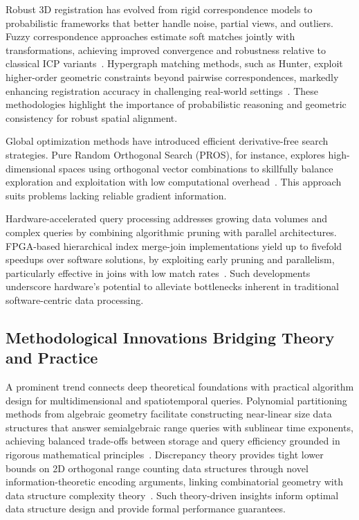 \documentclass[sigconf]{acmart}
\begin{document}
Robust 3D registration has evolved from rigid correspondence models to probabilistic frameworks that better handle noise, partial views, and outliers. Fuzzy correspondence approaches estimate soft matches jointly with transformations, achieving improved convergence and robustness relative to classical ICP variants~\cite{ref6}. Hypergraph matching methods, such as Hunter, exploit higher-order geometric constraints beyond pairwise correspondences, markedly enhancing registration accuracy in challenging real-world settings~\cite{ref7}. These methodologies highlight the importance of probabilistic reasoning and geometric consistency for robust spatial alignment.

Global optimization methods have introduced efficient derivative-free search strategies. Pure Random Orthogonal Search (PROS), for instance, explores high-dimensional spaces using orthogonal vector combinations to skillfully balance exploration and exploitation with low computational overhead~\cite{ref11}. This approach suits problems lacking reliable gradient information.

Hardware-accelerated query processing addresses growing data volumes and complex queries by combining algorithmic pruning with parallel architectures. FPGA-based hierarchical index merge-join implementations yield up to fivefold speedups over software solutions, by exploiting early pruning and parallelism, particularly effective in joins with low match rates~\cite{ref27}. Such developments underscore hardware’s potential to alleviate bottlenecks inherent in traditional software-centric data processing.

\subsection{Methodological Innovations Bridging Theory and Practice}

A prominent trend connects deep theoretical foundations with practical algorithm design for multidimensional and spatiotemporal queries. Polynomial partitioning methods from algebraic geometry facilitate constructing near-linear size data structures that answer semialgebraic range queries with sublinear time exponents, achieving balanced trade-offs between storage and query efficiency grounded in rigorous mathematical principles~\cite{ref3}. Discrepancy theory provides tight lower bounds on 2D orthogonal range counting data structures through novel information-theoretic encoding arguments, linking combinatorial geometry with data structure complexity theory~\cite{ref1}. Such theory-driven insights inform optimal data structure design and provide formal performance guarantees.
\end{document}
